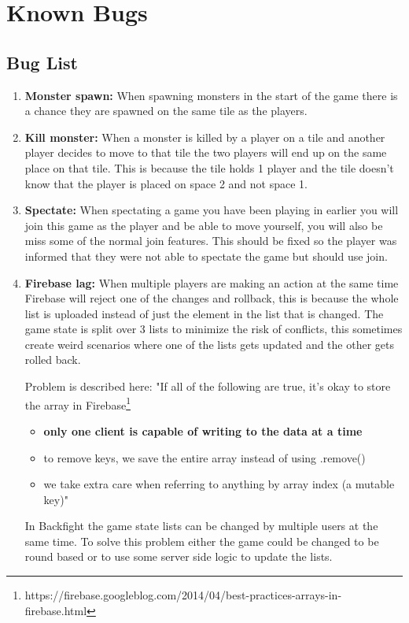 \pagestyle{Uni}

\chapter{Known Bugs}

\section{Bug List}

\begin{enumerate}
	\item \textbf{Monster spawn:} When spawning monsters in the start of the game there is a chance they are spawned on the same tile as the players.
	
	\item \textbf{Kill monster:} When a monster is killed by a player on a tile and another player decides to move to that tile the two players will end up on the same place on that tile. This is because the tile holds 1 player and the tile doesn't know that the player is placed on space 2 and not space 1.
		
	\item \textbf{Spectate:} When spectating a game you have been playing in earlier you will join this game as the player and be able to move yourself, you will also be miss some of the normal join features. This should be fixed so the player was informed that they were not able to spectate the game but should use join.

	\item \textbf{Firebase lag:} When multiple players are making an action at the same time Firebase will reject one of the changes and rollback, this is because the whole list is uploaded instead of just the element in the list that is changed. The game state is split over 3 lists to minimize the risk of conflicts, this sometimes create weird scenarios where one of the lists gets updated and the other gets rolled back.
	
	Problem is described here: "If all of the following are true, it's okay to store the array in Firebase\footnote{https://firebase.googleblog.com/2014/04/best-practices-arrays-in-firebase.html}
	
	\begin{itemize}
		\item \textbf{only one client is capable of writing to the data at a time}
		\item to remove keys, we save the entire array instead of using .remove()
		\item we take extra care when referring to anything by array index (a mutable key)"
	\end{itemize}
	In Backfight the game state lists can be changed by multiple users at the same time. To solve this problem either the game could be changed to be round based or to use some server side logic to update the lists.
	
\end{enumerate}